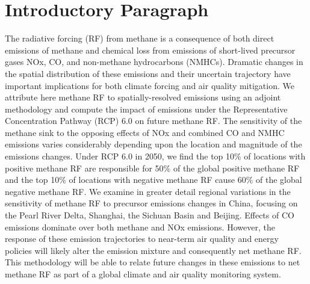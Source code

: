 \section*{Introductory Paragraph}

The radiative forcing (RF) from methane is a consequence of both direct emissions of methane and chemical loss from emissions of short-lived precursor gases NOx, CO, and non-methane hydrocarbons (NMHCs). Dramatic changes in the spatial distribution of these emissions and their uncertain trajectory have important implications for both climate forcing and air quality mitigation.  We attribute here methane RF to spatially-resolved emissions using an adjoint methodology and compute the impact of emissions under the Representative Concentration Pathway (RCP) 6.0 on future methane RF. The sensitivity of the methane sink to the opposing effects of NOx and combined CO and NMHC emissions varies considerably depending upon the location and magnitude of the emissions changes. Under RCP 6.0 in 2050, we find the top 10\% of locations with positive methane RF are responsible for 50\% of the global positive methane RF and the top 10\% of locations with negative methane RF cause 60\% of the global negative methane RF. We examine in greater detail regional variations in the sensitivity of methane RF to precursor emissions changes in China, focusing on the Pearl River Delta, Shanghai, the Sichuan Basin and Beijing. Effects of CO emissions dominate over both methane and NOx emissions. However, the response of these emission trajectories to near-term air quality and energy policies will likely alter the emission mixture and consequently net methane RF. This methodology will be able to relate future changes in these emissions to net methane RF as part of a global climate and air quality monitoring system. 